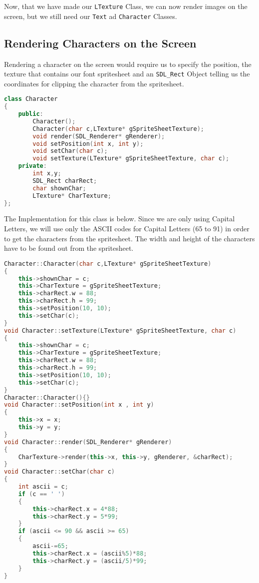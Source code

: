 \documentclass[11pt,fleqn]{book} %
\begin{document}
Now, that we have made our \texttt{LTexture} Class, we can now render images on the screen, but we still need our \texttt{Text} ad \texttt{Character} Classes.

\subsection{Rendering Characters on the Screen}

Rendering a character on the screen would require us to specify the position, the texture that contains our font spritesheet and an \texttt{SDL\_Rect} Object telling us the coordinates for clipping the character from the spritesheet.

\begin{lstlisting}[language=C++, caption={Use of Array of Pointers and Destructors}]
class Character
{
    public:
        Character();
        Character(char c,LTexture* gSpriteSheetTexture);
        void render(SDL_Renderer* gRenderer);
        void setPosition(int x, int y);
        void setChar(char c);
        void setTexture(LTexture* gSpriteSheetTexture, char c);
    private:
        int x,y;
        SDL_Rect charRect;
        char shownChar;
        LTexture* CharTexture;
};
\end{lstlisting}

The Implementation for this class is below. Since we are only using Capital Letters, we will use only the ASCII codes for Capital Letters (65 to 91) in order to get the characters from the spritesheet. The width and height of the characters have to be found out from the spritesheet.

\begin{lstlisting}[language=C++, caption={Use of Array of Pointers and Destructors}]
Character::Character(char c,LTexture* gSpriteSheetTexture)
{
    this->shownChar = c;
    this->CharTexture = gSpriteSheetTexture;
    this->charRect.w = 88;
    this->charRect.h = 99;
    this->setPosition(10, 10);
    this->setChar(c);
}
void Character::setTexture(LTexture* gSpriteSheetTexture, char c)
{
    this->shownChar = c;
    this->CharTexture = gSpriteSheetTexture;
    this->charRect.w = 88;
    this->charRect.h = 99;
    this->setPosition(10, 10);
    this->setChar(c);
}
Character::Character(){}
void Character::setPosition(int x , int y)
{
    this->x = x;
    this->y = y;
}
void Character::render(SDL_Renderer* gRenderer)
{
    CharTexture->render(this->x, this->y, gRenderer, &charRect);
}
void Character::setChar(char c)
{
    int ascii = c;
    if (c == ' ')
    {
        this->charRect.x = 4*88;
        this->charRect.y = 5*99;
    }
    if (ascii <= 90 && ascii >= 65)
    {
        ascii-=65;
        this->charRect.x = (ascii%5)*88;
        this->charRect.y = (ascii/5)*99;
    }
}
\end{lstlisting}
\end{document}

